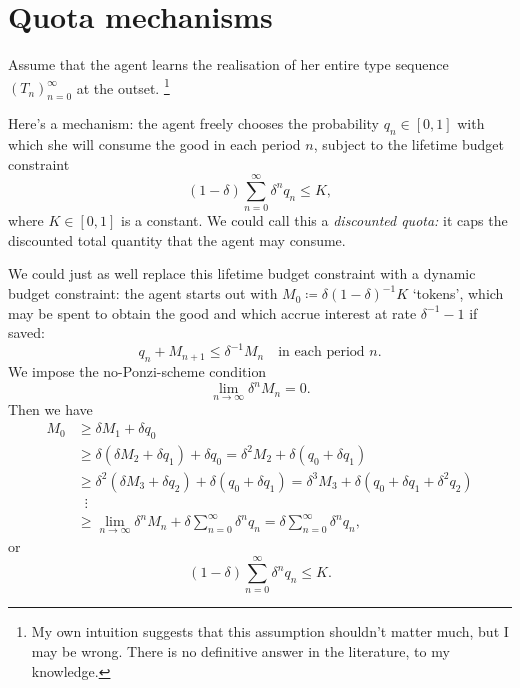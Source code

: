 \section{Quota mechanisms}
\label{sec:ch3:token}

Assume that the agent learns the realisation of her entire type sequence $(T_n)_{n=0}^\infty$ at the outset.%
	\footnote{My own intuition suggests that this assumption shouldn't matter much, but I may be wrong. There is no definitive answer in the literature, to my knowledge.}

Here's a mechanism:
the agent freely chooses
the probability $q_n \in [0,1]$ with which she will consume the good in each period $n$,
subject to the lifetime budget constraint
%
\begin{equation*}
	(1-\delta) \sum_{n=0}^\infty \delta^n q_n 
	\leq K ,
\end{equation*}
%
where $K \in [0,1]$ is a constant.
We could call this a \emph{discounted quota:}
it caps the discounted total quantity that the agent may consume.

We could just as well replace this lifetime budget constraint with a dynamic budget constraint: the agent starts out with $M_0 \coloneqq \delta (1-\delta)^{-1} K$ `tokens',
which may be spent to obtain the good and which accrue interest at rate $\delta^{-1}-1$ if saved:
%
\begin{equation*}
	q_n + M_{n+1}
	\leq \delta^{-1} M_n 
	\quad \text{in each period $n$.}
\end{equation*}
%
We impose the no-Ponzi-scheme condition
%
\begin{equation*}
	\lim_{n \to \infty} \delta^n M_n = 0 .
\end{equation*}
%
Then we have
%
\begin{align*}
	M_0
	&\geq \delta M_1 + \delta q_0
	\\
	&\geq \delta ( \delta M_2 + \delta q_1 )
	+ \delta q_0
	= \delta^2 M_2
	+ \delta ( q_0 + \delta q_1 )
	\\
	&\geq \delta^2 ( \delta M_3 + \delta q_2 )
	+ \delta ( q_0 + \delta q_1 )
	= \delta^3 M_3
	+ \delta \left( q_0 + \delta q_1 + \delta^2 q_2 \right)
	\\
	&\;\; \vdots
	\\
	&\geq \lim_{n \to \infty} \delta^n M_n
	+ \delta \sum_{n=0}^\infty \delta^n q_n 
	= \delta \sum_{n=0}^\infty \delta^n q_n ,
\end{align*}
%
or
%
\begin{equation*}
	(1-\delta) \sum_{n=0}^\infty \delta^n q_n
	\leq K.
\end{equation*}

